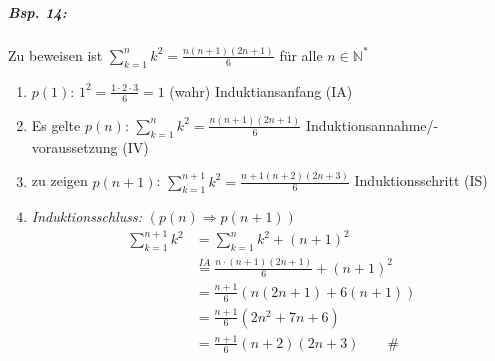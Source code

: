 \subparagraph{Bsp. 14:} \parskp
Zu beweisen ist $\sum^{n}_{k=1}k^2=\frac{n (n+1) (2n+1)}{6}$ für alle $n \in \mathbb{N}^*$
\begin{enumerate}
\item $p(1)$: $1^2=\frac{1\cdot2\cdot3}{6}=1$ (wahr) \qquad Induktiansanfang (IA)
\item Es gelte $p(n)$: $\sum^{n}_{k=1}k^2=\frac{n (n+1) (2n+1)}{6}$ \qquad Induktionsannahme/-voraussetzung (IV)
\item zu zeigen $p(n+1)$: $\sum^{n+1}_{k=1}k^2=\frac{n+1 (n+2) (2n+3)}{6}$ \qquad Induktionsschritt (IS)
\item \emph{Induktionsschluss:} $(p(n)\Rightarrow p(n+1))$
\begin{align*}
\sum^{n+1}_{k=1}k^2&=\sum^{n}_{k=1}k^2+ (n+1)^2 \\
&\overset{IA}{=} \frac{n\cdot (n+1)(2n+1)}{6}+(n+1)^2 \\
&= \frac{n+1}{6}\left(n(2n+1)+6(n+1)\right)\\
&= \frac{n+1}{6}(2n^2 + 7n + 6)\\
&= \frac{n+1}{6}(n+2)(2n+3) \qquad \#
\end{align*}
\end{enumerate}